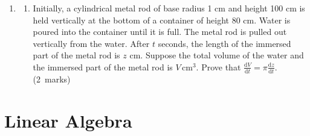\documentclass[12pt, a4paper]{article} %
\newcommand{\qmarks}[1]{\leavevmode\unskip\hspace*{\fill}\mbox{(#1 marks)}}
\begin{document}
\begin{enumerate}
\begin{center}
\begin{tikzpicture}[scale=1.2]
    \end{tikzpicture}
    \end{center}
    \begin{enumerate}
        \item By expressing \(OA\) in terms of \(\theta\) and \(\phi\), or otherwise, prove that\\ \(\displaystyle \frac{\mathrm{d}\theta}{\mathrm{d}t} + \frac{\mathrm{d}\phi}{\mathrm{d}t}=\frac{1}{136\sin \theta}\).
        \item Initially, \(\theta=0\). After \(80\) seconds, find
        \begin{enumerate}[label=(\arabic*)]
            \item the perpendicular distance of \(P\) from the rail \(OX\),
            \item the rate of change of \(\theta\).
        \end{enumerate}
    \end{enumerate}\qmarks{7}

    \item \begin{enumerate}
        \item Initially, a cylindrical metal rod of base radius 1 cm and height 100 cm is held vertically at the bottom of a container of height 80 cm. Water is poured into the container until it is full. The metal rod is pulled out vertically from the water. After \(t\) seconds, the length of the immersed part of the metal rod is \(z\) cm. Suppose the total volume of the water and the immersed part of the metal rod is \(V \,\mathrm{cm}^3\).
        \newline
        Prove that \(\displaystyle \frac{\mathrm{d}V}{\mathrm{d}t}=\pi\frac{\mathrm{d}z}{\mathrm{d}t}\). \qmarks{2}
    \end{enumerate}
\end{enumerate}

\newpage

\part{Linear Algebra}
\end{document}
